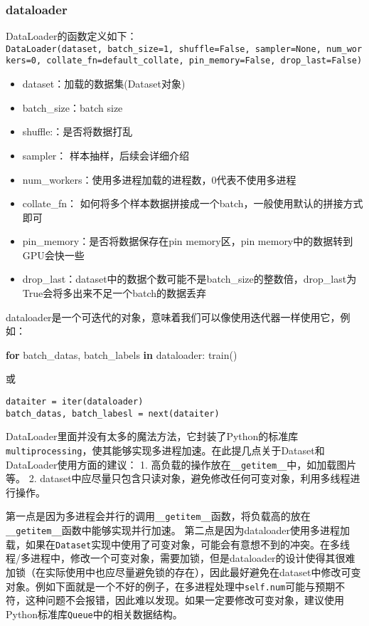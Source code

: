 \documentclass[11pt]{article}
\providecommand{\tightlist}{%
      \setlength{\itemsep}{0pt}\setlength{\parskip}{0pt}}
\newenvironment{Shaded}{}{}
\newcommand{\KeywordTok}[1]{\textcolor[rgb]{0.00,0.44,0.13}{\textbf{{#1}}}}
\newcommand{\NormalTok}[1]{{#1}}
\newcommand{\ControlFlowTok}[1]{\textcolor[rgb]{0.00,0.44,0.13}{\textbf{{#1}}}}
\begin{document}
\subsubsection{dataloader}\label{dataloader}

DataLoader的函数定义如下：
\texttt{DataLoader(dataset,\ batch\_size=1,\ shuffle=False,\ sampler=None,\ num\_workers=0,\ collate\_fn=default\_collate,\ pin\_memory=False,\ drop\_last=False)}

\begin{itemize}
\tightlist
\item
  dataset：加载的数据集(Dataset对象)
\item
  batch\_size：batch size
\item
  shuffle:：是否将数据打乱
\item
  sampler： 样本抽样，后续会详细介绍
\item
  num\_workers：使用多进程加载的进程数，0代表不使用多进程
\item
  collate\_fn：
  如何将多个样本数据拼接成一个batch，一般使用默认的拼接方式即可
\item
  pin\_memory：是否将数据保存在pin memory区，pin
  memory中的数据转到GPU会快一些
\item
  drop\_last：dataset中的数据个数可能不是batch\_size的整数倍，drop\_last为True会将多出来不足一个batch的数据丢弃
\end{itemize}

    dataloader是一个可迭代的对象，意味着我们可以像使用迭代器一样使用它，例如：

\begin{Shaded}
\begin{Highlighting}[]
\ControlFlowTok{for}\NormalTok{ batch_datas, batch_labels }\KeywordTok{in}\NormalTok{ dataloader:}
\NormalTok{    train()}
\end{Highlighting}
\end{Shaded}

或

\begin{verbatim}
dataiter = iter(dataloader)
batch_datas, batch_labesl = next(dataiter)
\end{verbatim}

    DataLoader里面并没有太多的魔法方法，它封装了Python的标准库\texttt{multiprocessing}，使其能够实现多进程加速。在此提几点关于Dataset和DataLoader使用方面的建议：
1. 高负载的操作放在\texttt{\_\_getitem\_\_}中，如加载图片等。 2.
dataset中应尽量只包含只读对象，避免修改任何可变对象，利用多线程进行操作。

第一点是因为多进程会并行的调用\texttt{\_\_getitem\_\_}函数，将负载高的放在\texttt{\_\_getitem\_\_}函数中能够实现并行加速。
第二点是因为dataloader使用多进程加载，如果在\texttt{Dataset}实现中使用了可变对象，可能会有意想不到的冲突。在多线程/多进程中，修改一个可变对象，需要加锁，但是dataloader的设计使得其很难加锁（在实际使用中也应尽量避免锁的存在），因此最好避免在dataset中修改可变对象。例如下面就是一个不好的例子，在多进程处理中\texttt{self.num}可能与预期不符，这种问题不会报错，因此难以发现。如果一定要修改可变对象，建议使用Python标准库\texttt{Queue}中的相关数据结构。
\end{document}
